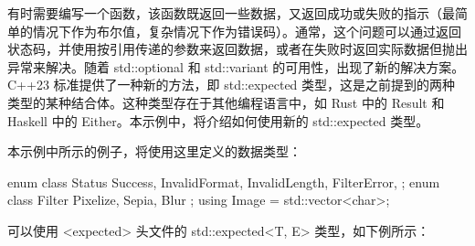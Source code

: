 
有时需要编写一个函数，该函数既返回一些数据，又返回成功或失败的指示（最简单的情况下作为布尔值，复杂情况下作为错误码）。通常，这个问题可以通过返回状态码，并使用按引用传递的参数来返回数据，或者在失败时返回实际数据但抛出异常来解决。随着 std::optional 和 std::variant 的可用性，出现了新的解决方案。C++23 标准提供了一种新的方法，即 std::expected 类型，这是之前提到的两种类型的某种结合体。这种类型存在于其他编程语言中，如 Rust 中的 Result 和 Haskell 中的 Either。本示例中，将介绍如何使用新的 std::expected 类型。


本示例中所示的例子，将使用这里定义的数据类型：

\begin{cpp}
enum class Status
{
    Success, InvalidFormat, InvalidLength, FilterError,
};
enum class Filter
{
    Pixelize, Sepia, Blur
};
using Image = std::vector<char>;
\end{cpp}


可以使用 <expected> 头文件的 std::expected<T, E> 类型，如下例所示：

